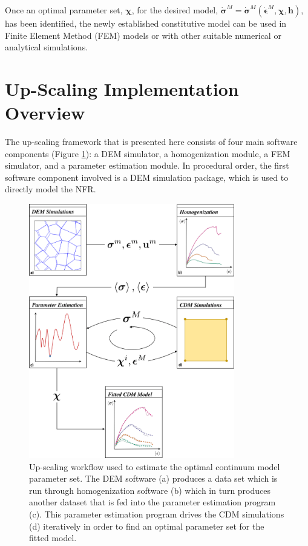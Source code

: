 Once an optimal parameter set, $\boldsymbol{\chi}$, for the desired model, $\dot{\boldsymbol{\sigma}}^M=\dot{\boldsymbol{\sigma}}^M\left(\dot{\boldsymbol{\epsilon}}^M, \boldsymbol{\chi},\mathbf{h}\right)$, has been identified, the newly established constitutive model can be used in Finite Element Method (FEM) models or with other suitable numerical or analytical simulations.

\section{Up-Scaling Implementation Overview}

The up-scaling framework that is presented here consists of four main software components (Figure \ref{fig:workflow}): a DEM simulator, a homogenization module, a FEM simulator, and a parameter estimation module. In procedural order, the first software component involved is a DEM simulation package, which is used to directly model the NFR. 

\begin{figure}[p]
\begin{center}
\includegraphics[width=0.8\textwidth]{figures/Chapter3/UpScalingFlowChart}
\caption{{\label{fig:workflow}Up-scaling workflow used to estimate the optimal continuum model parameter set. The DEM software (a) produces a data set which is run through homogenization software (b) which in turn produces another dataset that is fed into the parameter estimation program (c). This parameter estimation program drives the CDM simulations (d) iteratively in order to find an optimal parameter set for the fitted model.%
}}
\end{center}
\end{figure}

